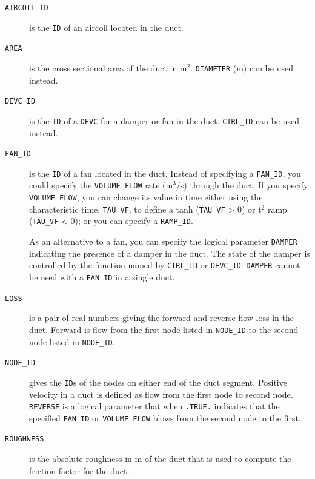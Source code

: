 \documentclass[11pt]{book}
\newcommand{\ct}{\tt\small}
\begin{document}
\begin{description}
\item[{\ct AIRCOIL\_ID}] is the {\ct ID} of an aircoil located in the duct.
\item[{\ct AREA}] is the cross sectional area of the duct in m$^2$. {\ct DIAMETER} (m) can be used instead.
\item[{\ct DEVC\_ID}]  is the {\ct ID} of a {\ct DEVC} for a damper or fan in the duct. {\ct CTRL\_ID} can be used instead.
\item[{\ct FAN\_ID}] is the {\ct ID} of a fan located in the duct. Instead of
specifying a {\ct FAN\_ID}, you could specify the {\ct VOLUME\_FLOW} rate (m$^3$/s) through the duct. If you specify {\ct VOLUME\_FLOW}, you can change its value in time either using the characteristic time, {\ct TAU\_VF},  to define a tanh ({\ct TAU\_VF} > 0) or t$^2$ ramp ({\ct TAU\_VF} < 0); or you can specify a {\ct RAMP\_ID}.

As an alternative to a fan, you can specify the logical parameter {\ct DAMPER} indicating the presence of a damper in the duct.  The state of the damper is controlled by
the function named by {\ct CTRL\_ID} or {\ct DEVC\_ID}.  {\ct DAMPER} cannot be used with a {\ct FAN\_ID} in a single duct.
\item[{\ct LOSS}] is a pair of real numbers giving the forward and reverse flow loss in the duct.  Forward is flow from the first node listed in {\ct NODE\_ID} to the second node listed in {\ct NODE\_ID}.
\item[{\ct NODE\_ID}] gives the {\ct ID}s of the nodes on either end of the duct segment.  Positive velocity in a duct is defined as flow from the first node to second node. 
{\ct REVERSE}  is a logical parameter that when {\ct .TRUE.} indicates that the specified {\ct FAN\_ID} or {\ct VOLUME\_FLOW} blows from the second node to the first.
\item[{\ct ROUGHNESS}]  is the absolute roughness in m of the duct that is used to compute the friction factor for the duct.
\end{description}
\end{document}
